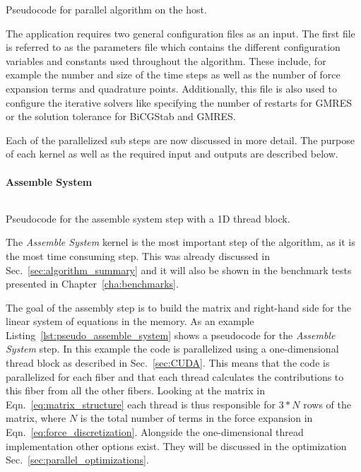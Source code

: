 \begin{listing}[!htbp]
  \centering
  \inputminted[mathescape,
    linenos,
    numbersep=5pt,
    fontsize=\footnotesize,
    frame=lines,
    framesep=2mm]{c}{lst/parallel_algorithm.lst}
  \caption{Pseudocode for parallel algorithm on the host.}
  \label{lst:pseudo_parallel_algorithm}
\end{listing}

The application requires two general configuration files as an input. The first file is referred to as the parameters file which contains the different configuration variables and constants used throughout the algorithm. These include, for example the number and size of the time steps as well as the number of force expansion terms and quadrature points. Additionally, this file is also used to configure the iterative solvers like specifying the number of restarts for GMRES or the solution tolerance for BiCGStab and GMRES.

Each of the parallelized sub steps are now discussed in more detail. The purpose of each kernel as well as the required input and outputs are described below.

\paragraph{Assemble System}

\begin{listing}[!htbp]
  \centering
  \inputminted[mathescape,
    linenos,
    numbersep=5pt,
    fontsize=\footnotesize,
    frame=lines,
    framesep=2mm]{c}{lst/assemble_system.lst}
  \caption{Pseudocode for the assemble system step with a 1D thread block.}
  \label{lst:pseudo_assemble_system}
\end{listing}

The \emph{Assemble System} kernel is the most important step of the algorithm, as it is the most time consuming step. This was already discussed in Sec.~\ref{sec:algorithm_summary} and it will also be shown in the benchmark tests presented in Chapter~\ref{cha:benchmarks}. 

The goal of the assembly step is to build the matrix and right-hand side for the linear system of equations in the memory. As an example Listing~\ref{lst:pseudo_assemble_system} shows a pseudocode for the \emph{Assemble System} step. In this example the code is parallelized using a one-dimensional thread block as described in Sec.~\ref{sec:CUDA}. This means that the code is parallelized for each fiber and that each thread calculates the contributions to this fiber from all the other fibers. Looking at the matrix in Eqn.~\eqref{eq:matrix_structure} each thread is thus responsible for $3*N$ rows of the matrix, where $N$ is the total number of terms in the force expansion in Eqn.~\eqref{eq:force_discretization}. Alongside the one-dimensional thread implementation other options exist. They will be discussed in the optimization Sec.~\ref{sec:parallel_optimizations}.

